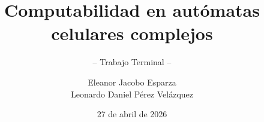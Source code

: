 \documentclass[graybox,envcountchap]{svmono}
\date{27 de abril de 2026}
\begin{document}
\author{Eleanor Jacobo Esparza\\Leonardo Daniel Pérez Velázquez}
\title{Computabilidad en autómatas celulares complejos}
\subtitle{-- Trabajo Terminal --}
\maketitle

\frontmatter%

%
%
%
%
%

\tableofcontents

%


\mainmatter%





%
%
%
%
%
%
%

\backmatter%
%


\end{document}
